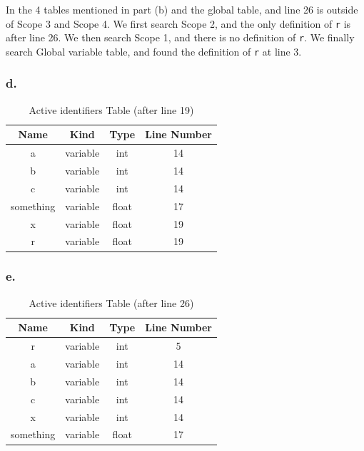 \documentclass{article}
\def\code#1{\texttt{#1}}
\begin{document}
	In the 4 tables mentioned in part (b) and the global table, and  line 26 is outside of Scope 3 and Scope 4.  We first search Scope 2, and the only definition of \code{r} is after line 26. We then search Scope 1, and there is no definition of \code{r}. We finally search Global variable table, and found the definition of \code{r} at line 3.
	
	\subsubsection*{d.}
	\begin{table}[h!]
		\begin{center}
			\caption{Active identifiers Table (after line 19)}
			\begin{tabular}{ |c|c|c|c|} 
				\toprule
				Name & Kind & Type & Line Number  \\ 
				\midrule
				a & variable & int & 14  \\ 
				b & variable & int & 14  \\ 
				c & variable & int & 14  \\ 
				something & variable & float & 17  \\ 
				x & variable & float & 19  \\ 
				r & variable & float & 19  \\ 
				\bottomrule		
			\end{tabular}
		\end{center}
	\end{table}

	\subsubsection*{e.}
	\begin{table}[h!]
		\begin{center}
			\caption{Active identifiers Table (after line 26)}
			\begin{tabular}{ |c|c|c|c|} 
				\toprule
				Name & Kind & Type & Line Number  \\ 
				\midrule
				r & variable & int & 5  \\ 
				a & variable & int & 14  \\ 
				b & variable & int & 14  \\ 
				c & variable & int & 14  \\ 
				x & variable & int & 14  \\ 
				something & variable & float & 17  \\ 
				\bottomrule		
			\end{tabular}
		\end{center}
	\end{table}
\end{document}
